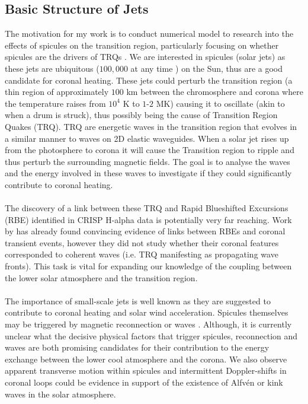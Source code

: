 \documentclass[12pt]{ociamthesis}
\newcommand{\Alfven}{Alfv\'{e}n }
\begin{document}
\subsection{Basic Structure of Jets}
The motivation for my work is to conduct numerical model to research into the effects of spicules on the transition region, particularly focusing on whether spicules are the drivers of TRQs \citep{Scullion2011}. We are interested in spicules (solar jets) as these jets are ubiquitous ($100,000$  at  any  time \citep{Beckers1968}) on the Sun, thus are a good candidate for coronal heating. These jets could perturb the transition region (a thin region of approximately $100$ km between the chromosphere and corona where the temperature raises from $10^4$ K to $1$-$2$ MK) causing it to oscillate (akin to when a drum is struck), thus possibly being the cause of Transition Region Quakes (TRQ). TRQ are energetic waves in the transition region that evolves in a similar manner to waves on 2D elastic waveguides. When a solar jet rises up from the photosphere to corona it will cause the Transition region to ripple and thus perturb the surrounding magnetic fields. The goal is to analyse the waves and the energy involved in these waves to investigate if they could significantly contribute to coronal heating. \\ \\ The discovery of a link between these TRQ and Rapid Blueshifted Excursions (RBE) identified in CRISP H-alpha data is potentially very far reaching. Work by \cite{Henriques2016} has already found convincing evidence of links between RBEs and coronal transient events, however they did not study whether their coronal features corresponded to coherent waves (i.e. TRQ manifesting as propagating wave fronts). This task is vital for expanding our knowledge of the coupling between the lower solar atmosphere and the transition region. \\ \\ The importance of small-scale jets is well known as they are suggested to contribute to coronal heating and solar wind acceleration. Spicules themselves may be triggered by magnetic reconnection \citep{Pontieu2007PASJ} or waves \citep{Pontieu2004Natur}. Although, it is currently unclear what the decisive physical factors that trigger spicules, reconnection and waves are both promising candidates for their contribution to the energy exchange between the lower cool atmosphere and the corona. We also observe apparent transverse motion within spicules and intermittent Doppler-shifts in coronal loops could be evidence in support of the existence of \Alfven or kink waves in the solar atmosphere.  \\ \\
\end{document}
